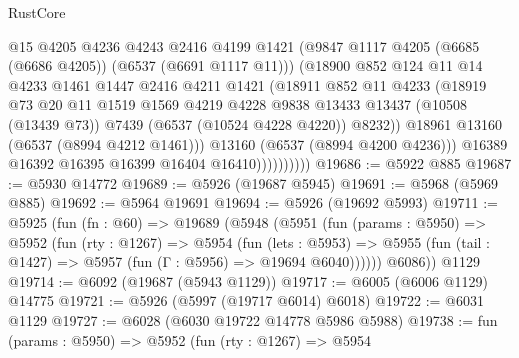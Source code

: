 \begin{lexlean}{RustCore}
\begin{coremodule}
                          @15
                          @4205
                          @4236
                          @4243
                          @2416
                          @4199
                          @1421
                          (@9847 @1117 @4205 (@6685 (@6686 @4205)) (@6537 (@6691 @1117 @11)))
                          (@18900
                            @852
                            @124
                            @11
                            @14
                            @4233
                            @1461
                            @1447
                            @2416
                            @4211
                            @1421
                            (@18911
                              @852
                              @11
                              @4233
                              (@18919
                                @73
                                @20
                                @11
                                @1519
                                @1569
                                @4219
                                @4228
                                @9838
                                @13433
                                @13437
                                (@10508 (@13439 @73))
                                @7439
                                (@6537 (@10524 @4228 @4220))
                                @8232))
                            @18961
                            @13160
                            (@6537 (@8994 @4212 @1461)))
                          @13160
                          (@6537 (@8994 @4200 @4236)))
                        @16389
                        @16392
                        @16395
                        @16399
                        @16404
                        @16410))))))))))
@19686 := @5922 @885
@19687 := @5930 @14772
@19689 := @5926 (@19687 @5945)
@19691 := @5968 (@5969 @885)
@19692 := @5964 @19691
@19694 := @5926 (@19692 @5993)
@19711 := @5925
    (fun (fn : @60) =>
    @19689
      (@5948
        (@5951
          (fun (params : @5950) =>
          @5952
            (fun (rty : @1267) =>
            @5954
              (fun (lets : @5953) =>
              @5955 (fun (tail : @1427) => @5957 (fun (Γ : @5956) => @19694 @6040))))))
        @6086))
    @1129
@19714 := @6092 (@19687 (@5943 @1129))
@19717 := @6005 (@6006 @1129) @14775
@19721 := @5926 (@5997 (@19717 @6014) @6018)
@19722 := @6031 @1129
@19727 := @6028 (@6030 @19722 @14778 @5986 @5988)
@19738 := fun (params : @5950) =>
  @5952
    (fun (rty : @1267) =>
    @5954

\end{coremodule}
\end{lexlean}
